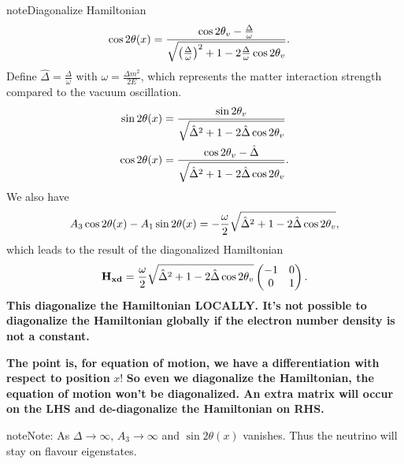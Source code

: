 \documentclass[letterpaper,12pt,english]{sphinxmanual}
\begin{document}
\begin{notice}{note}{Diagonalize Hamiltonian}
\begin{gather}
\begin{split}
\cos 2\theta(x)&= \frac{ \cos 2\theta_v - \frac{\Delta}{\omega} }{ \sqrt{ \left( \frac{\Delta}{\omega} \right)^2  +1 - 2 \frac{\Delta}{\omega}\cos 2\theta_v  }}.\end{split}\notag
\end{gather}
Define \(\hat\Delta = \frac{\Delta}{\omega}\) with \(\omega=\frac{\Delta m^2}{2E}\), which represents the matter interaction strength compared to the vacuum oscillation.
\begin{gather}
\begin{split}\sin 2\theta(x)  &= \frac{\sin 2\theta_v}{\sqrt{ \hat\Delta ^2+1 - 2 \hat\Delta \cos 2\theta_v }} \\
\cos 2\theta(x)&= \frac{ \cos 2\theta_v - \hat\Delta  }{ \sqrt{\hat\Delta ^2  +1 - 2 \hat\Delta \cos 2\theta_v } }.\end{split}\notag
\end{gather}
We also have
\begin{gather}
\begin{split}A_3\cos 2\theta(x) - A_1 \sin 2\theta(x) = -\frac{\omega}{2}\sqrt{\hat \Delta^2 +1 - 2\hat\Delta \cos 2\theta_v},\end{split}\notag
\end{gather}
which leads to the result of the diagonalized Hamiltonian
\begin{gather}
\begin{split}\mathbf{H_{xd}} = \frac{\omega}{2}\sqrt{\hat\Delta^2 +1 - 2\hat\Delta \cos 2\theta_v} \begin{pmatrix}
-1 & 0 \\
0 & 1
\end{pmatrix}.\end{split}\notag
\end{gather}
\textbf{This diagonalize the Hamiltonian LOCALLY. It's not possible to diagonalize the Hamiltonian globally if the electron number density is not a constant.}

\textbf{The point is, for equation of motion, we have a differentiation with respect to position} \(x\)! \textbf{So even we diagonalize the Hamiltonian, the equation of motion won't be diagonalized. An extra matrix will occur on the LHS and de-diagonalize the Hamiltonian on RHS.}
\end{notice}

\begin{notice}{note}{Note:}
As \(\Delta \to \infty\), \(A_3\to \infty\) and \(\sin 2\theta(x)\) vanishes. Thus the neutrino will stay on flavour eigenstates.
\end{notice}
\end{document}

